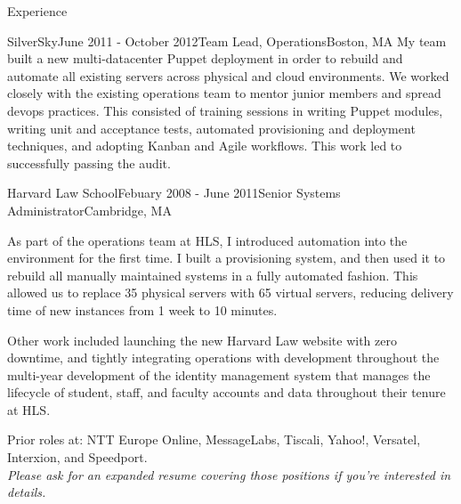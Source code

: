 \documentclass{resume} %
\begin{document}
\begin{rSection}{Experience}
\begin{rSubsection}{SilverSky}{June 2011 - October 2012}{Team Lead, Operations}{Boston, MA}
My team built a new multi-datacenter Puppet deployment in order to rebuild and automate all existing servers across physical and cloud environments.  We worked closely with the existing operations team to mentor junior members and spread devops practices.  This consisted of training sessions in writing Puppet modules, writing unit and acceptance tests, automated provisioning and deployment techniques, and adopting Kanban and Agile workflows.  This work led to successfully passing the audit.
\end{rSubsection}

\begin{rSubsection}{Harvard Law School}{Febuary 2008 - June 2011}{Senior Systems Administrator}{Cambridge, MA}
\item[] As part of the operations team at HLS, I introduced automation into the environment for the first time.  I built a provisioning system, and then used it to rebuild all manually maintained systems in a fully automated fashion.  This allowed us to replace 35 physical servers with 65 virtual servers, reducing delivery time of new instances from 1 week to 10 minutes.

Other work included launching the new Harvard Law website with zero downtime, and tightly integrating operations with development throughout the multi-year development of the identity management system that manages the lifecycle of student, staff, and faculty accounts and data throughout their tenure at HLS.
\end{rSubsection}

\begin{center}
Prior roles at: NTT Europe Online, MessageLabs, Tiscali, Yahoo!, Versatel, Interxion, and Speedport.\\
\textit{Please ask for an expanded resume covering those positions if you're interested in details.}
\end{center}

\end{rSection}

\end{document}
